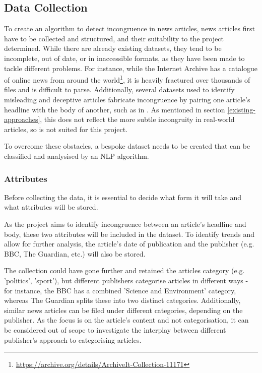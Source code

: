 \subsection{Data Collection}
To create an algorithm to detect incongruence in news articles, news articles first have to be collected and structured, and their suitability to the project determined. While there are already existing datasets, they tend to be incomplete, out of date, or in inaccessible formats, as they have been made to tackle different problems. For instance, while the Internet Archive has a catalogue of online news from around the world\footnote{\url{https://archive.org/details/ArchiveIt-Collection-11171}}, it is heavily fractured over thousands of files and is difficult to parse. Additionally, several datasets used to identify misleading and deceptive articles fabricate incongruence by pairing one article's headline with the body of another, such as in . As mentioned in section \ref{existing-approaches}, this does not reflect the more subtle incongruity in real-world articles, so is not suited for this project.

To overcome these obstacles, a bespoke dataset needs to be created that can be classified and analysised by an NLP algorithm.

\subsubsection{Attributes}
Before collecting the data, it is essential to decide what form it will take and what attributes will be stored.

As the project aims to identify incongruence between an article's headline and body, these two attributes will be included in the dataset. To identify trends and allow for further analysis, the article's date of publication and the publisher (e.g. BBC, The Guardian, etc.) will also be stored.

The collection could have gone further and retained the articles category (e.g. 'politics', 'sport'), but different publishers categorise articles in different ways - for instance, the BBC has a combined 'Science and Environment' category, whereas The Guardian splits these into two distinct categories. Additionally, similar news articles can be filed under different categories, depending on the publisher. As the focus is on the article's content and not categorisation, it can be considered out of scope to investigate the interplay between different publisher's approach to categorising articles.

